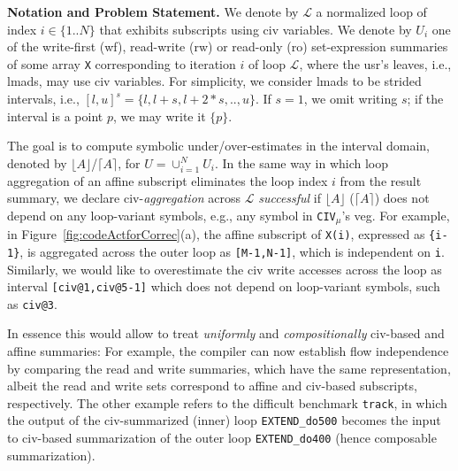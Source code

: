 \documentclass{sig-alternate}
\begin{document}
{\bf Notation and Problem Statement.}
%
We denote by $\mathcal{L}$ a normalized loop of index $i\in\{1..N\}$ that
exhibits subscripts using {\sc civ} variables.
%
We denote by $U_i$ one of the write-first ({\sc wf}), read-write ({\sc rw})
or read-only ({\sc ro}) set-expression summaries of some array {\tt X} 
corresponding to iteration $i$ of loop $\mathcal{L}$, where the {\sc usr}'s 
leaves, i.e., {\sc lmad}s, may use {\sc civ} variables. 
%
For simplicity, we consider {\sc lmad}s to be 
strided intervals, i.e., $[l,u]^s=\{l, l+s, l+2*s, .., u\}$.
If $s=1$, we omit writing $s$; if the interval 
is a point $p$, we may write it $\{p\}$.

The goal is to compute symbolic under/over-estimates in the 
interval domain, denoted by $\lfloor A \rfloor$/$\lceil A \rceil$, 
for $U = \cup_{i=1}^{N} U_i$.
%
In the same way in which loop aggregation of an affine subscript  
eliminates the loop index $i$ from the result summary,
we declare {\sc civ}-{\em aggregation} across $\mathcal{L}$ {\em successful} 
if $\lfloor A \rfloor$ ($\lceil A \rceil$) does not depend on any loop-variant
symbols, e.g., any symbol in {\tt CIV}$_{\mu}$'s  {\sc veg}. %
%
For example, in Figure~\ref{fig:codeActforCorrec}(a), the affine
subscript of {\tt X(i)}, expressed as {\tt\{i-1\}}, is aggregated across 
the outer loop as {\tt[M-1,N-1]}, which is independent on {\tt i}. 
Similarly, we would like to overestimate the {\sc civ} write accesses 
across the loop as interval {\tt[civ@1,civ@5-1]} which does
not depend on loop-variant symbols, such as {\tt civ@3}.

In essence this would allow to treat {\em uniformly} and {\em compositionally} 
{\sc civ}-based and affine summaries: For example, the compiler can now 
establish flow independence by comparing the read and write summaries, 
which have the same representation, albeit the read and write sets
correspond to affine and {\sc civ}-based subscripts, respectively.
The other example refers to the difficult benchmark
{\tt track}, in which the output of the {\sc civ}-summarized (inner) loop 
{\tt EXTEND\_do500} becomes the input to {\sc civ}-based summarization 
of the outer loop {\tt EXTEND\_do400} (hence composable summarization).
\end{document}
